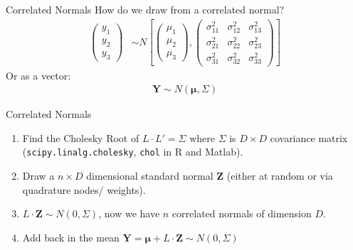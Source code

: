 \documentclass[xcolor=pdftex,dvipsnames,table,mathserif,aspectratio=169]{beamer}
\begin{document}
\begin{frame}{Correlated Normals}
How do we draw from a correlated normal?
\begin{align*}
\begin{pmatrix}
y_{1}\\
y_{2}\\
y_{3}
\end{pmatrix} & \sim 
N\left[\left(\begin{array}{c}
\mu_1 \\
\mu_2\\
\mu_3
\end{array}\right),\left(\begin{array}{ccc}
\sigma_{11}^2 & \sigma_{12}^2& \sigma_{13}^2\\
\sigma_{21}^2 & \sigma_{22}^2 & \sigma_{23}^2\\
\sigma_{31}^2 & \sigma_{32}^2 & \sigma_{33}^2
\end{array}\right)\right]
\end{align*}
Or as a vector:
\begin{align*}
\mathbf{Y} \sim N(\boldsymbol{\mu},\Sigma)
\end{align*}
\end{frame}

\begin{frame}{Correlated Normals}
\begin{enumerate}
\item Find the \alert{Cholesky Root} of $L \cdot L' =\Sigma$ where $\Sigma$ is $D \times D$ covariance matrix\\ (\texttt{scipy.linalg.cholesky}, \texttt{chol} in R and Matlab).
\item Draw a $n \times D$ dimensional standard normal $\mathbf{Z}$ (either at random or via quadrature nodes/ weights).
\item $L \cdot \mathbf{Z} \sim N(0,\Sigma)$, now we have $n$ correlated normals of dimension $D$.
\item Add back in the mean $\mathbf{Y}=\boldsymbol{\mu} + L \cdot \mathbf{Z} \sim N(0,\Sigma)$
\end{enumerate}
\end{frame}
\end{document}
